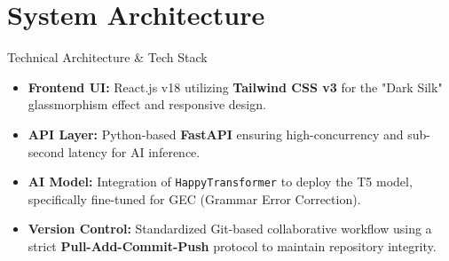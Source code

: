 \documentclass{beamer}
\begin{document}
\section{System Architecture}
\begin{frame}{Technical Architecture \& Tech Stack}
    \begin{itemize}
        \item \textbf{Frontend UI:} React.js v18 utilizing \textbf{Tailwind CSS v3} for the "Dark Silk" glassmorphism effect and responsive design.
        \item \textbf{API Layer:} Python-based \textbf{FastAPI} ensuring high-concurrency and sub-second latency for AI inference.
        \item \textbf{AI Model:} Integration of \texttt{HappyTransformer} to deploy the T5 model, specifically fine-tuned for GEC (Grammar Error Correction).
        \item \textbf{Version Control:} Standardized Git-based collaborative workflow using a strict \textbf{Pull-Add-Commit-Push} protocol to maintain repository integrity.
    \end{itemize}
\end{frame}

\end{document}
